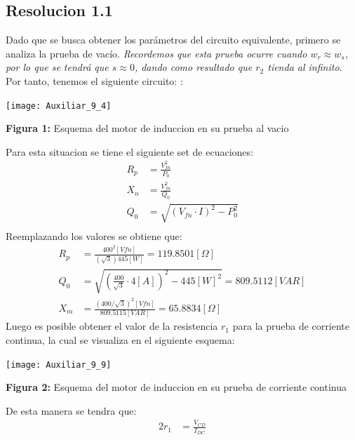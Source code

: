 \documentclass[
  11pt,
  letterpaper,
   addpoints,
   answers
  ]{exam}
\begin{document}
\begin{questions}
\begin{solution}
        \subsection*{Resolucion 1.1}
        Dado que se busca obtener los parámetros del circuito equivalente, primero se analiza la prueba de vacío. 
        \textit{Recordemos que esta prueba ocurre cuando \( w_r \approx w_s \), por lo que se tendrá que \( s \approx 0 \), dando como resultado que \( r_2 \) tienda al infinito}. Por tanto, tenemos el siguiente circuito:
        :
        \begin{center}
            \texttt{[image: Auxiliar\_9\_4]}
        \end{center}
        \begin{center}
            \textbf{Figura 1:} Esquema del motor de induccion en su prueba al vacio
        \end{center}
        Para esta situacion se tiene el siguiente set de ecuaciones:
        \begin{align}
            R_{p} &= \frac{V_{fn}^{2}}{P_{0}}\\
            X_{n} &= \frac{V_{fn}^{2}}{Q_{0}}\\
            Q_{0} &= \sqrt{(V_{fn} \cdot I)^{2} - P_{0}^{2}}\\
        \end{align}
        Reemplazando los valores se obtiene que:
        \begin{align}
            R_{p} &= \frac{400^{2}[Vfn]}{(\sqrt{3})445[W]} = 119.8501[\Omega]\\
            Q_{0} &= \sqrt{\left(\frac{400}{\sqrt{3}} \cdot 4[A]\right)^{2} - 445[W]^{2}} = 809.5112[VAR]\\
            X_{m} &= \frac{(400/\sqrt{3})^{2}[Vfn]}{809.5115[VAR]} = 65.8834[\Omega]
        \end{align}
        Luego es posible obtener el valor de la resistencia $r_{1}$ para la prueba de corriente continua, la cual se visualiza en el siguiente esquema:
        \begin{center}
            \texttt{[image: Auxiliar\_9\_9]}
        \end{center}
        \begin{center}
            \textbf{Figura 2:} Esquema del motor de induccion en su prueba de corriente continua
        \end{center}
        De esta manera se tendra que:
        \begin{align}
            2r_{1} &= \frac{V_{CD}}{I_{DC}}\\

\end{align}
\end{solution}
\end{questions}
\end{document}
